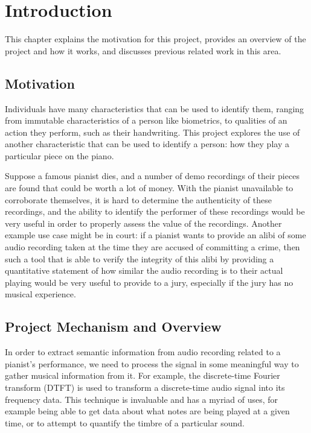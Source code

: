 \documentclass[oneside, class=book, crop=false, 12pt]{standalone}
\begin{document}
\ifstandalone
  \setcounter{chapter}{0}
  \chapter{Introduction}
\fi
{}

This chapter explains the motivation for this project, provides an overview of the project and how it works, and discusses previous related work in this area.

\section{Motivation}

Individuals have many characteristics that can be used to identify them, ranging from immutable characteristics of a person like biometrics, to qualities of an action they perform, such as their handwriting. This project explores the use of another characteristic that can be used to identify a person: how they play a particular piece on the piano. 

Suppose a famous pianist dies, and a number of demo recordings of their pieces are found that could be worth a lot of money. With the pianist unavailable to corroborate themselves, it is hard to determine the authenticity of these recordings, and the ability to identify the performer of these recordings would be very useful in order to properly assess the value of the recordings. Another example use case might be in court: if a pianist wants to provide an alibi of some audio recording taken at the time they are accused of committing a crime, then such a tool that is able to verify the integrity of this alibi by providing a quantitative statement of how similar the audio recording is to their actual playing would be very useful to provide to a jury, especially if the jury has no musical experience.

\section{Project Mechanism and Overview}

In order to extract semantic information from audio recording related to a pianist's performance, we need to process the signal in some meaningful way to gather musical information from it. For example, the discrete-time Fourier transform (DTFT) is used to transform a discrete-time audio signal into its frequency data. This technique is invaluable and has a myriad of uses, for example being able to get data about what notes are being played at a given time, or to attempt to quantify the timbre of a particular sound.
\end{document}
